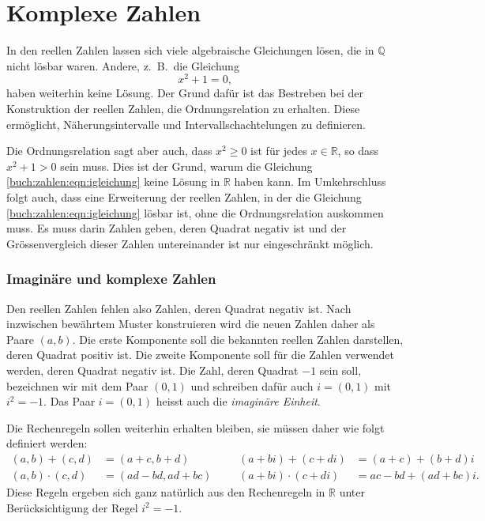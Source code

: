 %
%
%
\section{Komplexe Zahlen
\label{buch:section:komplexe-zahlen}}
In den reellen Zahlen lassen sich viele algebraische Gleichungen lösen,
die in $\mathbb{Q}$ nicht lösbar waren.
Andere, z.~B.~die Gleichung
\begin{equation}
x^2+1=0,
\label{buch:zahlen:eqn:igleichung}
\end{equation}
haben weiterhin keine Lösung.
Der Grund dafür ist das Bestreben bei der Konstruktion der reellen Zahlen, 
die Ordnungsrelation zu erhalten.
%
Diese ermöglicht, Näherungsintervalle und Intervallschachtelungen
zu definieren.

Die Ordnungsrelation sagt aber auch, dass $x^2\ge 0$ ist für jedes
$x\in\mathbb{R}$, so dass $x^2+1>0$ sein muss.
Dies ist der Grund, warum die Gleichung \ref{buch:zahlen:eqn:igleichung}
keine Lösung in $\mathbb{R}$ haben kann.
Im Umkehrschluss folgt auch, dass eine Erweiterung der reellen Zahlen,
in der die Gleichung \eqref{buch:zahlen:eqn:igleichung} lösbar ist,
ohne die Ordnungsrelation auskommen muss.
Es muss darin Zahlen geben, deren Quadrat negativ ist und der
Grössenvergleich dieser Zahlen untereinander ist nur eingeschränkt
möglich.

\subsubsection{Imaginäre und komplexe Zahlen}
Den reellen Zahlen fehlen also Zahlen, deren Quadrat negativ ist.
Nach inzwischen bewährtem Muster konstruieren wird die neuen Zahlen
daher als Paare $(a,b)$.
Die erste Komponente soll die bekannten reellen Zahlen darstellen,
deren Quadrat positiv ist.
Die zweite Komponente soll für die Zahlen verwendet werden, deren Quadrat
negativ ist.
Die Zahl, deren Quadrat $-1$ sein soll, bezeichnen wir mit dem
Paar $(0,1)$ und schreiben dafür auch $i=(0,1)$ mit $i^2=-1$.
Das Paar $i=(0,1)$ heisst auch die {\em imaginäre Einheit}.
%

Die Rechenregeln sollen weiterhin erhalten bleiben, sie müssen daher
wie folgt definiert werden:
\begin{equation}
\begin{aligned}
(a,b) + (c,d) &= (a+c,b+d) &&& (a+bi) + (c+di) &= (a+c) + (b+d)i
\\
(a,b) \cdot (c,d) &= (ad-bd, ad+bc) &&& (a+bi)\cdot(c+di) &= ac-bd + (ad+bc)i.
\end{aligned}
\label{buch:zahlen:cregeln}
\end{equation}
Diese Regeln ergeben sich ganz natürlich aus den Rechenregeln
in $\mathbb{R}$ unter Berücksichtigung der Regel $i^2=-1$.

